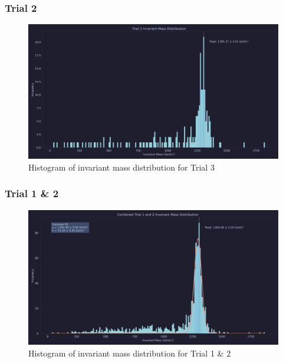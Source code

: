 \documentclass{beamer}
\begin{document}
\begin{frame}
\frametitle{Trial 2}
\begin{figure}
    \centering
    \includegraphics[width=1\textwidth]{dongimages/trial3.png}
    \caption{Histogram of invariant mass distribution for Trial 3}
    \label{fig:trial3}
\end{figure}
\end{frame}

\begin{frame}
\frametitle{Trial 1 \& 2}
\begin{figure}
    \centering
    \includegraphics[width=1\textwidth]{dongimages/trial1_2.png}
    \caption{Histogram of invariant mass distribution for Trial 1 \& 2}
    \label{fig:trial1and2}
\end{figure}
\end{frame}
\end{document}

